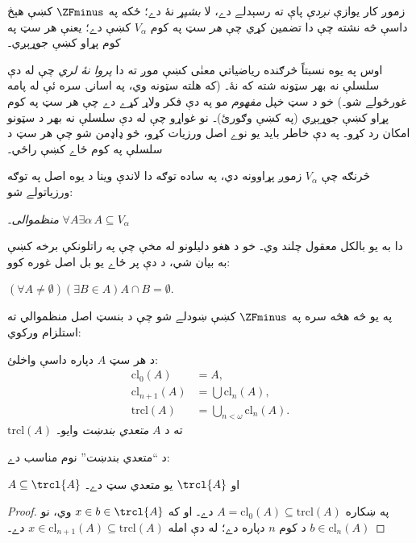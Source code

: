 \documentclass[../../../include/open-logic-section]{subfiles}
\begin{document}


زموږ کار يوازې \emph{نږدې} پاې ته رسېدلے دے، لا \emph{بشپړ} نۀ دے؛ ځکه په
$\ZFminus$ کښې هېڅ داسې څه نشته چې دا تضمين کړي چې \emph{هر} سټ په کوم
$V_\alpha$ کښې دے؛ يعنې هر سټ په کوم پړاو کښې جوړېږي۔

اوس په يوه نسبتاً څرګنده رياضياتي معنٰی کښې موږ ته دا \emph{پروا نۀ لري}
چې له دې سلسلې نه بهر سټونه شته که نۀ۔ (که هلته سټونه وي، په اسانۍ سره ئې
له پامه غورځولے شو۔) خو د سټ خپل \emph{مفهوم} مو په دې فکر ولاړ کړے دے چې
هر سټ په کوم پړاو کښې جوړېږي (په  کښې \stageshier{}
وګورئ)۔ نو غواړو چې له دې سلسلې نه بهر د سټونو امکان رد کړو۔ په دې خاطر
بايد يو نوے اصل ورزيات کړو، څو ډاډمن شو چې هر سټ د سلسلې په کوم ځاے کښې
راځي۔

څرنګه چې $V_\alpha$ زموږ پړاوونه دي، په ساده توګه دا لاندې وينا د يوه
اصل په توګه ورزياتولے شو:

\begin{defish}
\emph{منظموالی۔} $\forall A \exists \alpha\, A \subseteq V_\alpha$
\end{defish}

دا به يو بالکل معقول چلند وي۔ خو د هغو دليلونو له مخې چې په راتلونکې
برخه کښې به بيان شي، د دې پر ځاے يو بل اصل غوره کوو:

\begin{axiom}
$(\forall A \neq \emptyset)(\exists B \in A)A \cap B = \emptyset$.
\end{axiom}

په يو څه هڅه سره په $\ZFminus$ کښې ښودلے شو چې د بنسټ اصل منظموالي ته
استلزام ورکوي:
\begin{defn}
د هر سټ $A$ دپاره داسې واخلئ:
\begin{align*}
	\text{cl}_0(A) &= A,\\
	\text{cl}_{n+1}(A) &= \bigcup \text{cl}_n(A),\\
	\text{trcl}(A) &= \bigcup_{n < \omega} \text{cl}_{n}(A).
\end{align*}
$\text{trcl}(A)$ ته د $A$ \emph{متعدي بندښت} وايو۔
\end{defn}
\noindent
د ``متعدي بندښت'' نوم مناسب دے:
\begin{prop}
$A \subseteq \trcl{A}$ او $\trcl{A}$ يو متعدي سټ دے۔
\end{prop}

\begin{proof}
په ښکاره $A = \text{cl}_0(A) \subseteq \text{trcl}(A)$ دے۔ او که $x
\in b \in \trcl{A}$ وي، نو $b \in \text{cl}_n(A)$ د کوم $n$ دپاره دے؛
له دې امله $x \in \text{cl}_{n+1}(A) \subseteq \text{trcl}(A)$ دے۔
\end{proof}
\end{document}
